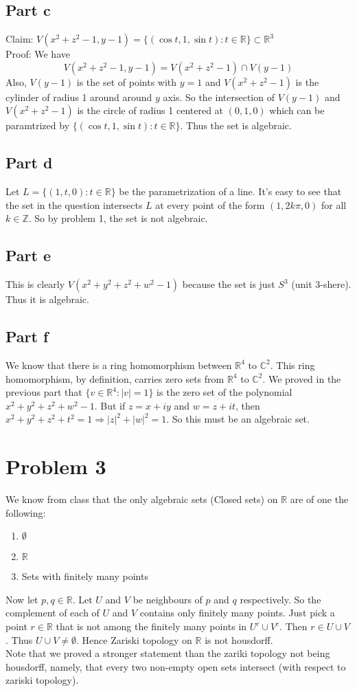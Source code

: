 \documentclass[12pt]{article}
\begin{document}
\subsection*{Part c}
Claim: $V(x^2+z^2-1,y-1) =\{(\cos t,1,\sin t):t \in \mathbb{R}\} \subset \mathbb{R}^3$ \\
Proof: We have
$$V(x^2+z^2-1,y-1) = V(x^2+z^2-1) \cap V(y-1)$$
Also, $V(y-1)$ is the set of points with $y=1$ and
$V(x^2+z^2-1)$ is the cylinder of radius 1 around around $y$ axis. So the intersection of $V(y-1)$ and $V(x^2+z^2-1)$ is the circle of radius 1 centered at $(0,1,0)$ which can be paramtrized by $\{(\cos t,1,\sin t):t \in \mathbb{R}\}$. Thus the set is algebraic.
\subsection*{Part d}
Let $L=\{(1,t,0): t \in \mathbb{R}\}$ be the parametrization of a line. It's easy to see that the set in the question intersects $L$ at every point of the form $(1,2k\pi,0)$ for all $k \in \mathbb{Z}$. So by problem 1, the set is not algebraic.
\subsection*{Part e}
This is clearly $V(x^2+y^2+z^2+w^2-1)$ because the set is just $S^3$ (unit 3-shere). Thus it is algebraic.
\subsection*{Part f}
We know that there is a ring homomorphism between $\mathbb{R}^4$ to $\mathbb{C}^2$. This ring homomorphism, by definition, carries zero sets from $\mathbb{R}^4$ to
$\mathbb{C}^2$. We proved in the previous part that $\{v \in \mathbb{R}^4: |v|=1\}$ is the zero set of the polynomial $x^2+y^2+z^2+w^2-1$. But if $z=x+iy$ and $w=z+it$, then $x^2+y^2+z^2+t^2=1 \Rightarrow |z|^2+|w|^2=1$. So this must be an algebraic set.


\clearpage
\section*{Problem 3}
We know from class that the only algebraic sets (Closed sets) on $\mathbb{R}$ are of one the following:
\begin{enumerate}
\item $\emptyset $
\item $\mathbb{R}$
\item Sets with finitely many points
\end{enumerate}
Now let $p,q \in \mathbb{R}$. 
Let $U$ and $V$ be neighbours of $p$ and $q$ respectively. So the complement of each of $U$ and $V$ contains only finitely many points. Just pick a point $r \in \mathbb{R}$ that is not among the finitely many points in $U^{c} \cup V^{c}$. Then $r \in U \cup V$.
Thus $U \cup V \not= \emptyset$.
Hence Zariski topology on $\mathbb{R}$ is not housdorff.
\\
Note that we proved a stronger statement than the zariki topology not being housdorff, namely, that every two non-empty open sets intersect (with respect to zariski topology).
\end{document}
